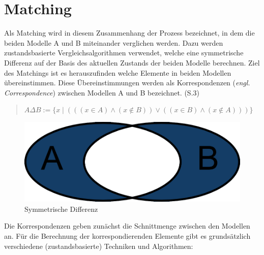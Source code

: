 \section{Matching}
\label{sec:matching}

Als Matching wird in diesem Zusammenhang der Prozess bezeichnet, in dem die beiden Modelle A und B
miteinander verglichen werden. Dazu werden zustandsbasierte Vergleichsalgorithmen verwendet, welche
eine symmetrische Differenz auf der Basis des aktuellen Zustands der beiden Modelle berechnen.  Ziel
des Matchings ist es herauszufinden welche Elemente in beiden Modellen übereinstimmen. Diese
Übereinstimmungen werden als Korrespondenzen (\textit{engl. Correspondence}) zwischen Modellen A und
B bezeichnet. \cite{KeKT2011ASE} (S.3)

\begin{quote}
\centering
$A \Delta B := \{x \mid (((x \in  A)\wedge(x \not\in B))\vee((x \in B)\wedge(x \not\in A))) \}$
\end{quote}

\begin{figure}[htb]
  \centering
  \includegraphics[scale=0.4]{images/symmetrische_Differenz.png}
  \caption{Symmetrische Differenz}
  \label{fig:sym_diff}
\end{figure}

Die Korrespondenzen geben zunächst die Schnittmenge zwischen den Modellen an. Für die Berechnung der
korrespondierenden Elemente gibt es grundsätzlich verschiedene (zustandsbasierte) Techniken und
Algorithmen:

